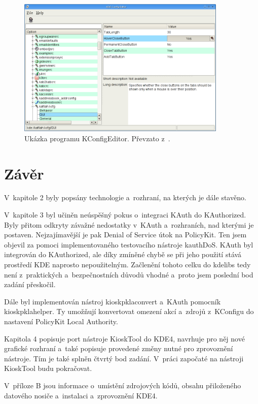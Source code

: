 \begin{figure}[h]
    \centering
    \includegraphics[width=10cm]{obrazky/kconfigeditor1.png}
    \caption{Ukázka programu KConfigEditor. Převzato z~\cite{KConfigEditor}.}
    \label{fig:kconfeditor}
\end{figure}


\chapter{Závěr}
V~kapitole 2 byly popsány technologie a~rozhraní, na kterých je dále stavěno.

V~kapitole 3 byl učiněn neúspěšný pokus o~integraci KAuth do KAuthorized. Byly přitom odkryty závažné nedostatky v~KAuth a~rozhraních, nad kterými je postaven. Nejzajímavější je pak Denial of Service útok na PolicyKit. Ten jsem objevil za pomoci implementovaného testovacího nástroje kauthDoS. KAuth byl integrován do KAuthorized, ale díky zmíněné chybě se při jeho použití stává prostředí KDE naprosto nepoužitelným. Začlenění tohoto celku do kdelibs tedy není z~praktických a~bezpečnostních důvodů vhodné a~proto jsem poslední bod zadání přeskočil.

Dále byl implementován nástroj kioskpklaconvert a~KAuth pomocník kioskpklahelper. Ty umožňují konvertovat omezení akcí a~zdrojů z~KConfigu do nastavení PolicyKit Local Authority.

Kapitola 4 popisuje port nástroje KioskTool do KDE4, navrhuje pro něj nové grafické rozhraní a~také popisuje provedené změny nutné pro zprovoznění nástroje. Tím je také splněn čtvrtý bod zadání. V~práci započaté na nástroji KioskTool budu pokračovat.

V~příloze B jsou informace o~umístění zdrojových kódů, obsahu přiloženého datového nosiče a~instalaci a~zprovoznění KDE4.

\appendix
